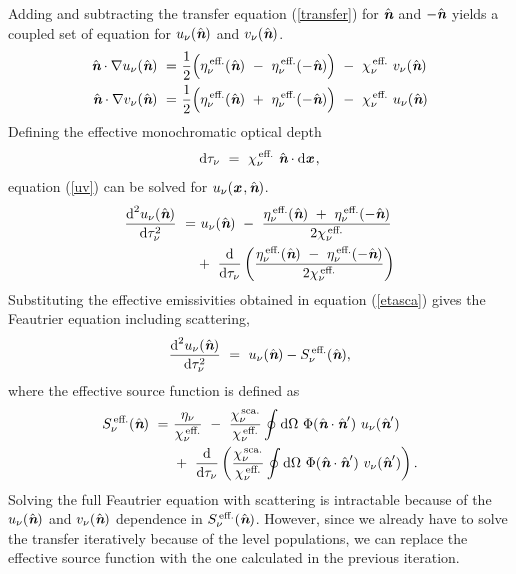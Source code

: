 \documentclass[a4paper,fleqn,usenatbib]{mnras}
\newcommand{\D}{\text{d}}
\newcommand{\x}{{\textit{\textbf{x}}}\,}
\newcommand{\n}{\hat{\textit{\textbf{n}}}}
\begin{document}
Adding and subtracting the transfer equation (\ref{transfer}) for $\n$ and $-\n$ yields a coupled set of equation for $u_{\nu}(\n)$ and $v_{\nu}(\n)$.
\begin{equation}
\begin{split}
		\n \cdot \nabla u_{\nu}(\n) \ = \ & \frac{1}{2}\Big( \eta^{\,\text{eff.}}_{\nu}(\n)
		\ - \ \eta^{\,\text{eff.}}_{\nu}(-\n) \Big) \ - \ \chi^{\,\text{eff.}}_{\nu} \ v_{\nu}(\n) \\
		\n \cdot \nabla v_{\nu}(\n) \ = \ & \frac{1}{2}\Big( \eta^{\,\text{eff.}}_{\nu}(\n)
		\ + \ \eta^{\,\text{eff.}}_{\nu}(-\n) \Big) \ - \ \chi^{\,\text{eff.}}_{\nu} \ u_{\nu}(\n)
\end{split}
\label{uv}
\end{equation}
Defining the effective monochromatic optical depth
\begin{equation}
	\D\tau_{\nu} \ = \ \chi^{\,\text{eff.}}_{\nu} \ \n \cdot \D \x,
\end{equation}
equation (\ref{uv}) can be solved for $u_{\nu}(\x,\n)$.
\begin{equation}
\begin{split}
	\frac{\D^{2} u_{\nu}(\n)}{\D \tau_{\nu}^{2}} \ = & \ u_{\nu}(\n) \ - \ \frac{ \eta^{\,\text{eff.}}_{\nu}(\n) \ + \ \eta^{\,\text{eff.}}_{\nu}(-\n) }{ 2\chi^{\,\text{eff.}}_{\nu} } \\
	\ &+ \ \frac{\D}{\D\tau_{\nu}} \left( \frac{ \eta^{\,\text{eff.}}_{\nu}(\n) \ - \ \eta^{\,\text{eff.}}_{\nu}(-\n) }{ 2\chi^{\,\text{eff.}}_{\nu} } \right)
\end{split}
\end{equation}
Substituting the effective emissivities obtained in equation (\ref{etasca}) gives the Feautrier equation including scattering,
\begin{equation}
\begin{split}
	\frac{\D^{2} u_{\nu}(\n)}{\D \tau_{\nu}^{2}} \ = \ u_{\nu}(\n) - S^{\,\text{eff.}}_{\nu}(\n),
\end{split}
\end{equation}
where the effective source function is defined as
\begin{equation}
\begin{split}
	S^{\,\text{eff.}}_{\nu}(\n) \ = & \ \frac{\eta_{\nu}}{\chi^{\,\text{eff.}}_{\nu}} \ - \ \frac{  \chi^{\,\text{sca.}}_{\nu}}{ \chi^{\,\text{eff.}}_{\nu}} \oint \D\Omega \ \Phi(\n\cdot\n') \ u_{\nu}(\n') \\
	& \ + \ \frac{\D}{\D\tau_{\nu}}  \left( \frac{  \chi^{\,\text{sca.}}_{\nu}}{ \chi^{\,\text{eff.}}_{\nu}} \oint \D\Omega \ \Phi(\n\cdot\n') \ v_{\nu}(\n') \right).
\end{split}
\end{equation}
Solving the full Feautrier equation with scattering is intractable because of the $u_{\nu}(\n)$ and $v_{\nu}(\n)$ dependence in $S^{\,\text{eff.}}_{\nu}(\n)$. However, since we already have to solve the transfer iteratively because of the level populations, we can replace the effective source function with the one calculated in the previous iteration.
\end{document}

